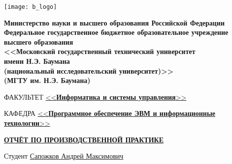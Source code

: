 \begin{titlepage}
	\noindent \begin{minipage}{0.15\textwidth}
		\texttt{[image: b\_logo]}
	\end{minipage}
	\hfill
	\begin{minipage}{0.85\textwidth}\raggedleft
		\begin{center}
			\fontsize{12pt}{0.3\baselineskip}\selectfont \textbf{Министерство науки и высшего образования Российской Федерации \\ Федеральное государственное бюджетное образовательное учреждение \\ высшего образования \\ <<Московский государственный технический университет \\ имени Н.Э. Баумана \\ (национальный исследовательский университет)>> \\ (МГТУ им. Н.Э. Баумана)}
		\end{center}
	\end{minipage}
	
	\begin{center}
		\fontsize{12pt}{0.1\baselineskip}\selectfont
		\noindent\makebox[\linewidth]{\rule{\textwidth}{4pt}} \makebox[\linewidth]{\rule{\textwidth}{1pt}}
	\end{center}
	
	\begin{flushleft}
		\fontsize{12pt}{0.8\baselineskip}\selectfont 
		
		ФАКУЛЬТЕТ \uline{<<\textbf{Информатика и системы управления}>> \hfill}
		
		КАФЕДРА \uline{\mbox{\hspace{4mm}} <<\textbf{Программное обеспечение ЭВМ и информационные технологии}>> \hfill}
	\end{flushleft}
	
	\vfill
	
	\begin{center}
		\fontsize{20pt}{\baselineskip}\selectfont
		
		\uline{\textbf{ОТЧЁТ ПО ПРОИЗВОДСТВЕННОЙ ПРАКТИКЕ}}
	\end{center}
	
	\vfill
	
	\begin{flushleft}
		\fontsize{12pt}{0.7\baselineskip}\selectfont
		
		Студент \uline{\mbox{\hspace{44mm}} Сапожков Андрей Максимович \hfill}
		

\end{flushleft}
\end{titlepage}
